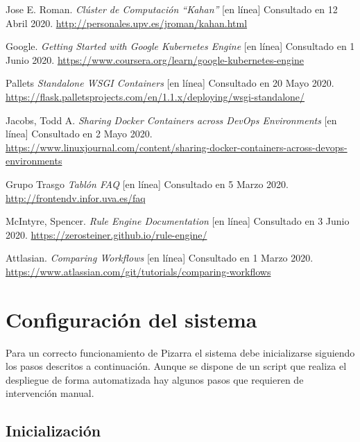 \documentclass[11pt,spanish,listoffigures,listoftables]{tfgetsinf}
\begin{document}
\begin{thebibliography}{10}
	Jose E. Roman. \textit{Clúster de Computación ``Kahan''} [en línea]
	\newblock Consultado en 12 Abril 2020.
	\url{http://personales.upv.es/jroman/kahan.html}
	
	Google. \textit{Getting Started with Google Kubernetes Engine} [en línea]
	\newblock Consultado en 1 Junio 2020.
	\url{https://www.coursera.org/learn/google-kubernetes-engine}
	
	Pallets \textit{Standalone WSGI Containers} [en línea]
	\newblock Consultado en 20 Mayo 2020.
	\url{https://flask.palletsprojects.com/en/1.1.x/deploying/wsgi-standalone/}
	
	Jacobs, Todd A. \textit{Sharing Docker Containers across DevOps Environments} [en línea]
	\newblock Consultado en 2 Mayo 2020.
	\url{https://www.linuxjournal.com/content/sharing-docker-containers-across-devops-environments}
	
	Grupo Trasgo \textit{Tablón FAQ} [en línea]
	\newblock Consultado en 5 Marzo 2020.
	\url{http://frontendv.infor.uva.es/faq}
	
	McIntyre, Spencer. \textit{Rule Engine Documentation} [en línea]
	\newblock Consultado en 3 Junio 2020.
	\url{https://zerosteiner.github.io/rule-engine/}
	
	Attlasian. \textit{Comparing Workflows} [en línea]
	\newblock Consultado en 1 Marzo 2020.
	\url{https://www.atlassian.com/git/tutorials/comparing-workflows}


\end{thebibliography}
\cleardoublepage

\APPENDIX

\chapter{Configuración del sistema}

Para un correcto funcionamiento de Pizarra el sistema debe inicializarse siguiendo los pasos descritos a continuación. Aunque se dispone de un script que realiza el despliegue de forma automatizada hay algunos pasos que requieren de intervención manual.

\section{Inicialización}
\end{document}
